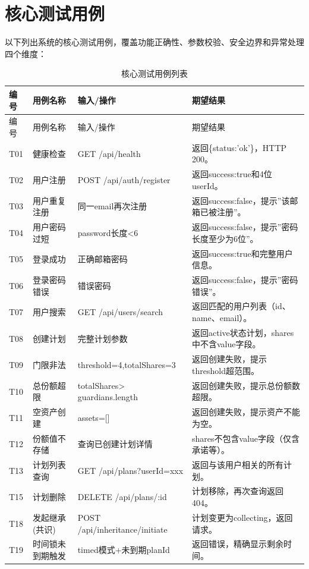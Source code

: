 \documentclass[UTF8,a4paper,zihao=-4,openany]{ctexrep}
\begin{document}
\section{核心测试用例}

以下列出系统的核心测试用例，覆盖功能正确性、参数校验、安全边界和异常处理四个维度：

\setlength{\extrarowheight}{4pt}
\begin{longtable}{p{1.3cm}p{3.2cm}p{4.2cm}p{5.5cm}}
\caption{核心测试用例列表}\\
\toprule
编号 & 用例名称 & 输入/操作 & 期望结果\\
\midrule
\endfirsthead
\toprule
编号 & 用例名称 & 输入/操作 & 期望结果\\
\midrule
\endhead
T01 & 健康检查 & GET /api/health & 返回\{status:'ok'\}，HTTP 200。\\
T02 & 用户注册 & POST /api/auth/register & 返回success:true和4位userId。\\
T03 & 用户重复注册 & 同一email再次注册 & 返回success:false，提示”该邮箱已被注册”。\\
T04 & 用户密码过短 & password长度<6 & 返回success:false，提示”密码长度至少为6位”。\\
T05 & 登录成功 & 正确邮箱密码 & 返回success:true和完整用户信息。\\
T06 & 登录密码错误 & 错误密码 & 返回success:false，提示”密码错误”。\\
T07 & 用户搜索 & GET /api/users/search & 返回匹配的用户列表（id、name、email）。\\
T08 & 创建计划 & 完整计划参数 & 返回active状态计划，shares中不含value字段。\\
T09 & 门限非法 & threshold=4,totalShares=3 & 返回创建失败，提示threshold超范围。\\
T10 & 总份额超限 & totalShares> guardians.length & 返回创建失败，提示总份额数超限。\\
T11 & 空资产创建 & assets=[] & 返回创建失败，提示资产不能为空。\\
T12 & 份额值不存储 & 查询已创建计划详情 & shares不包含value字段（仅含承诺等）。\\
T13 & 计划列表查询 & GET /api/plans?userId=xxx & 返回与该用户相关的所有计划。\\
T15 & 计划删除 & DELETE /api/plans/:id & 计划移除，再次查询返回404。\\
T18 & 发起继承(共识) & POST /api/inheritance/initiate & 计划变更为collecting，返回请求。\\
T19 & 时间锁未到期触发 & timed模式+未到期planId & 返回错误，精确显示剩余时间。\\

\end{longtable}
\end{document}
